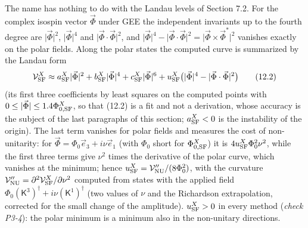 \documentclass[
  10pt,
]{article}
\begin{document}
The name has nothing to do with the Landau levels of Section 7.2. For
the complex isospin vector \(\vec\Phi\) under GEE the independent
invariants up to the fourth degree are \(\lvert\vec\Phi\rvert^2\),
\(\lvert\vec\Phi\rvert^4\) and \(\lvert\vec\Phi\cdot\vec\Phi\rvert^2\),
and
\(\lvert\vec\Phi\rvert^4-\lvert\vec\Phi\cdot\vec\Phi\rvert^2=\lvert\vec\Phi\times\vec\Phi^*\rvert^2\)
vanishes exactly on the polar fields. Along the polar states the
computed curve is summarized by the Landau form
\[\mathcal V^X_{\rm SF}\approx a^X_{\rm SF}\lvert\vec\Phi\rvert^2+b^X_{\rm SF}\lvert\vec\Phi\rvert^4+c^X_{\rm SF}\lvert\vec\Phi\rvert^6+u^X_{\rm SF}\big(\lvert\vec\Phi\rvert^4-\lvert\vec\Phi\cdot\vec\Phi\rvert^2\big)\tag{12.2}\]
(its first three coefficients by least squares on the computed points
with \(0\le\lvert\vec\Phi\rvert\le1.4\Phi^X_{0,{\rm SF}}\), so that
(12.2) is a fit and not a derivation, whose accuracy is the subject of
the last paragraphs of this section; \(a^X_{\rm SF}<0\) is the
instability of the origin). The last term vanishes for polar fields and
measures the cost of non-unitarity: for
\(\vec\Phi=\Phi_0\vec e_3+i\nu\vec e_1\) (with \(\Phi_0\) short for
\(\Phi^X_{0,{\rm SF}}\)) it is \(4u^X_{\rm SF}\Phi_0^2\nu^2\), while the
first three terms give \(\nu^2\) times the derivative of the polar
curve, which vanishes at the minimum; hence
\(u^X_{\rm SF}=\mathcal V''_{\rm NU}/(8\Phi_0^2)\), with the curvature
\(\mathcal V''_{\rm NU}=\partial^2\mathcal V^X_{\rm SF}/\partial\nu^2\)
computed from states with the applied field
\(\Phi_0(\mathsf K^3)^\dagger+i\nu(\mathsf K^1)^\dagger\) (two values of
\(\nu\) and the Richardson extrapolation, corrected for the small change
of the amplitude). \(u^X_{\rm SF}>0\) in every method (\emph{check
P3-4}): the polar minimum is a minimum also in the non-unitary
directions.
\end{document}
